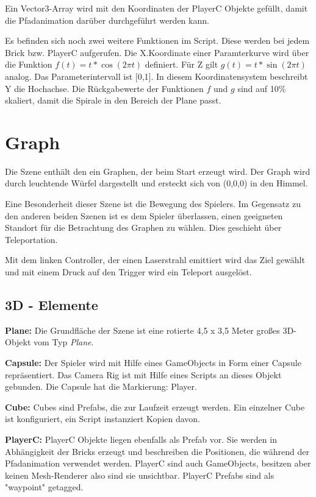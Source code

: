 Ein Vector3-Array wird mit den Koordinaten der PlayerC Objekte gefüllt, damit die Pfadanimation darüber durchgeführt werden kann.

Es befinden sich noch zwei weitere Funktionen im Script. Diese werden bei jedem Brick bzw. PlayerC aufgerufen. Die X.Koordinate einer Paramterkurve wird über die Funktion $ f(t) = t * \cos(2 \pi t) $ definiert. Für Z gilt $g(t) = t * \sin(2 \pi t)$ analog. Das Parameterintervall ist [0,1]. 
 In diesem Koordinatensystem beschreibt Y die Hochachse.
Die Rückgabewerte der Funktionen $f$ und $g$ sind auf 10\% skaliert, damit die Spirale in den Bereich der Plane passt.

\section{Graph}
\label{ graphScene }

Die Szene enthält den ein Graphen, der beim Start erzeugt wird. Der Graph wird durch leuchtende Würfel dargestellt und ersteckt sich von (0,0,0) in \glqq den Himmel\grqq{}.

Eine Besonderheit dieser Szene ist die Bewegung des Spielers. Im Gegensatz zu den anderen beiden Szenen ist es dem Spieler überlassen, einen geeigneten Standort für die Betrachtung des Graphen zu wählen. Dies geschieht über Teleportation. 

Mit dem linken Controller, der einen Laserstrahl emittiert wird das Ziel gewählt und mit einem Druck auf den Trigger wird ein Teleport ausgelöst. 


\subsection{3D - Elemente}

\textbf{Plane: } Die Grundfläche der Szene ist eine rotierte 4,5 x 3,5 Meter großes 3D-Objekt vom Typ \emph{Plane}.

\textbf{Capsule: } Der Spieler wird mit Hilfe eines GameObjects in Form einer Capsule repräsentiert. Das Camera Rig ist mit Hilfe eines Scripts an dieses Objekt gebunden. Die Capsule hat die Markierung: Player.

\textbf{Cube: } Cubes sind Prefabs, die zur Laufzeit erzeugt werden. Ein einzelner Cube ist konfiguriert, ein Script instanziert Kopien davon.

\textbf{PlayerC: } PlayerC Objekte liegen ebenfalls als Prefab vor. Sie werden in Abhängigkeit der Bricks erzeugt und beschreiben die Positionen, die während der Pfadanimation verwendet werden. PlayerC sind auch GameObjects, besitzen aber keinen Mesh-Renderer also sind sie unsichtbar. PlayerC Prefabs sind als "waypoint" getagged.

